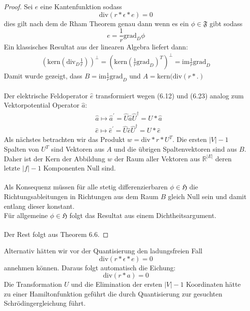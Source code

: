 \documentclass[11pt,a4paper,leqno]{report}
\numberwithin{equation}{chapter}
\begin{document}
\begin{proof}
	Sei $e$ eine Kantenfunktion sodass 
	\begin{equation*}
		\text{div}(r * \epsilon * e) = 0
	\end{equation*} dies gilt nach dem de Rham Theorem genau dann wenn es ein $\phi\in\mathfrak{F}$ gibt sodass 
\begin{equation*}
	e = \frac{1}{r}\text{grad}_D\phi
\end{equation*}
Ein klassisches Resultat aus der linearen Algebra liefert dann:
\begin{align*}
	 (\text{kern} (\text{div}_D\frac{1}{r}))^\perp 
	 =(\text{kern}(\frac{1}{r}\text{grad}_D)^T)^\perp =\text{im}\frac{1}{r}\text{grad}_D
\end{align*}
Damit wurde gezeigt, dass $B=\text{im}\frac{1}{r}\text{grad}_D$ und $A=\text{kern}(\text{div}(r*.)$\\
\\
Der elektrische Feldoperator $\hat{e}$ transformiert wegen (6.12) und (6.23) analog zum Vektorpotential Operator $\hat{a}$:
\begin{align}
	&\hat{a} \mapsto \hat{a}^{'} = \hat{U}\hat{a}\hat{U}^\dagger = U * \hat{a}\\
	&\hat{e} \mapsto \hat{e}^{'} = \hat{U}\hat{e}\hat{U}^\dagger = U * \hat{e}
\end{align}
Als n\"achstes betrachten wir das Produkt $w = \text{div} * r * U^T$.
Die ersten $|V| - 1$ Spalten von $U^T$ sind Vektoren aus $A$ und die \"ubrigen Spaltenvektoren sind aus $B$. Daher ist der Kern der Abbildung $w$ der Raum aller Vektoren aus $\mathbb{R}^{|E|}$ deren letzte $|f| - 1$ Komponenten Null sind.\\
\\
Als Konsequenz m\"ussen f\"ur alle stetig differenzierbaren $\phi\in\mathfrak{H}$ die Richtungsableitungen in Richtungen aus dem Raum $B$ gleich Null sein und damit entlang dieser konstant.\\
F\"ur allgemeine $\phi\in\mathfrak{H}$ folgt das Resultat aus einem Dichtheitsargument.\\
\\
Der Rest folgt aus Theorem 6.6.
\end{proof}
\noindent
Alternativ h\"atten wir vor der Quantisierung den ladungsfreien Fall
 \begin{equation}
 	\text{div}(r * \epsilon * e) = 0
 \end{equation}
 annehmen k\"onnen. Daraus folgt automatisch die Eichung:
 \begin{equation}
	\text{div}(r * a) = 0
\end{equation}
Die Transformation $U$ und die Elimination der ersten $|V| - 1$ Koordinaten h\"atte zu einer Hamiltonfunktion gef\"uhrt die durch Quantisierung zur gesuchten Schr\"odingergleichung f\"uhrt.
\end{document}
